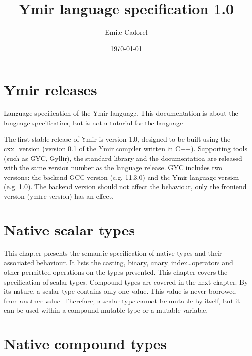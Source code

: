 \documentclass[a4paper,11pt]{book}
\author{Emile Cadorel}
\date{\today}
\title{Ymir language specification 1.0}
\begin{document}

\maketitle
\dominitoc
\dominilof
\dominilot

\chapter*{Ymir releases}

Language specification of the Ymir language. This documentation is about the language specification, but is not a tutorial for the language.


The first stable release of Ymir is version 1.0, designed to be built using the cxx\_version (version 0.1 of the Ymir compiler written in C++). Supporting tools (such as GYC, Gyllir), the standard library and the documentation are released with the same version number as the language release. GYC includes two versions: the backend GCC version (e.g. 11.3.0) and the Ymir language version (e.g. 1.0). The backend version should not affect the behaviour, only the frontend version (ymirc version) has an effect.

\begin{multicols*}{2}
  \tableofcontents
\end{multicols*}


\chapter{Native scalar types}

This chapter presents the semantic specification of native types and their
associated behaviour. It lists the casting, binary, unary, index\ldots operators
and other permitted operations on the types presented. This chapter covers the
specification of scalar types. Compound types are covered in the next chapter.
By its nature, a scalar type contains only one value. This value is never
borrowed from another value. Therefore, a scalar type cannot be mutable by
itself, but it can be used within a compound mutable type or a mutable variable.

\begin{multicols*}{2}
  \minitoc%
  
\end{multicols*}

\chapter{Native compound types}
\end{document}
